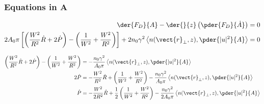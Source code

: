 \subsubsection{Equations in A}
\begin{equation}
\begin{split}
    \der{F_{D}}{A}  - \der{}{z}\left(\pder{F_{D}}{\dot{A}}\right) &= 0 \\
   2A_0 \pi\left[ \left(\frac{W^2}{R^2}\dot{R} + 2 \dot{P}\right)  - \left(\frac{1}{W^2} + \frac{W^2}{R^2}\right) \right] +  2n_0 \gamma^2 \left< n(\vect{r}_{\perp},z),\pder{|u|^2}{A}\right>  &= 0 \\
   \end{split}
\end{equation}

\begin{equation}
\begin{split}
\left(\frac{W^2}{R^2}\dot{R} + 2 \dot{P}\right)  - \left(\frac{1}{W^2} + \frac{W^2}{R^2}\right) &= -  \frac{n_0 \gamma^2}{ A_0 \pi} \left< n(\vect{r}_{\perp},z),\pder{|u|^2}{A}\right>  \\
 2 \dot{P}  &= - \frac{W^2}{R^2}\dot{R} + \left(\frac{1}{W^2} + \frac{W^2}{R^2}\right) -  \frac{n_0 \gamma^2}{ A_0 \pi} \left< n(\vect{r}_{\perp},z),\pder{|u|^2}{A}\right>  \\
  \dot{P}  &= - \frac{W^2}{2R^2}\dot{R} + \frac{1}{2}\left(\frac{1}{W^2} + \frac{W^2}{R^2}\right) -  \frac{n_0 \gamma^2}{ 2 A_0 \pi} \left< n(\vect{r}_{\perp},z),\pder{|u|^2}{A}\right>  \\
   \end{split}
\end{equation}

